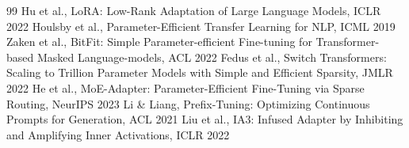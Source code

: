 \documentclass[11pt,a4paper]{article}
\begin{document}

\begin{thebibliography}{99}
 Hu et al., LoRA: Low-Rank Adaptation of Large Language Models, ICLR 2022
 Houlsby et al., Parameter-Efficient Transfer Learning for NLP, ICML 2019
 Zaken et al., BitFit: Simple Parameter-efficient Fine-tuning for Transformer-based Masked Language-models, ACL 2022
 Fedus et al., Switch Transformers: Scaling to Trillion Parameter Models with Simple and Efficient Sparsity, JMLR 2022
 He et al., MoE-Adapter: Parameter-Efficient Fine-Tuning via Sparse Routing, NeurIPS 2023
 Li & Liang, Prefix-Tuning: Optimizing Continuous Prompts for Generation, ACL 2021
 Liu et al., IA3: Infused Adapter by Inhibiting and Amplifying Inner Activations, ICLR 2022
\end{thebibliography}
\end{document}
